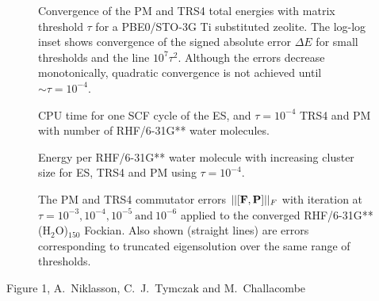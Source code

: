 \commentoutA{\documentclass[prb,aps,twocolumn,showpacs,twocolumngrid,superbib]{revtex4}}
\begin{document}
{\begin{figure}[h]
\caption{Convergence of the PM and TRS4 total energies with matrix threshold $\tau$ 
         for a PBE0/STO-3G Ti substituted zeolite.  The log-log inset shows
         convergence of the signed absolute error $\Delta E$ for small 
         thresholds and the line $10^{7} \tau^2$.  Although the errors decrease monotonically, 
         quadratic convergence is not achieved until $\sim \tau = 10^{-4}$.}\label{xeerrors}

\caption{CPU time for one SCF cycle of the ES, and 
	 $\tau=10^{-4}$ TRS4 and PM with number of RHF/6-31G** water molecules.}\label{cputimes}

\caption{Energy per RHF/6-31G** water molecule with increasing cluster size for ES, TRS4 and PM 
         using $\tau=10^{-4}$.}\label{waterenergyerrors}

\caption{The PM and TRS4 commutator errors $||[{\bf F ,P }]||_F$ with iteration
         at $\tau=10^{-3}, 10^{-4}, 10^{-5}~\text{and}~10^{-6}$ applied to the
         converged RHF/6-31G** (H$_2$O)$_{150}$ Fockian. Also shown (straight lines) are errors 
         corresponding to truncated eigensolution over the same 
         range of thresholds.}\label{commerrors}

\end{figure}

\clearpage

\begin{center}
Figure 1, A.~Niklasson,  C.~J.~Tymczak and M.~Challacombe \\[1.cm]
\end{center}

}
\end{document}
